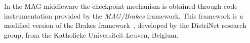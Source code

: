 \documentclass[times, 09pt, twocolumn]{article}
\begin{document}
%

In the MAG middleware the checkpoint mechanism is obtained through code
instrumentation provided by the \emph{MAG/Brakes} framework. This
framework is a modified version of the Brakes framework~\cite{brakes00}, developed by the
DistriNet research group, from the Katholieke Universiteit Leuven, Belgium. 
\end{document}
